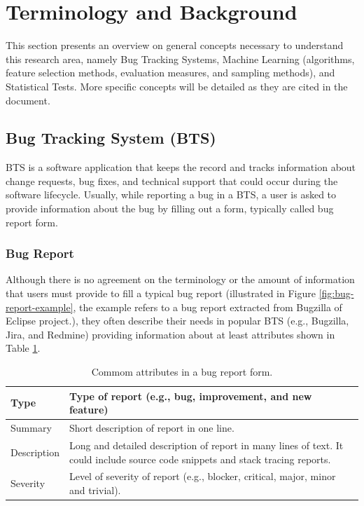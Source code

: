 \section{Terminology and Background}\label{sec:background} 
This section presents an overview on general concepts necessary to understand this research area, namely Bug Tracking Systems, Machine Learning (algorithms, feature selection methods, evaluation measures, and sampling methods), and Statistical Tests. More specific concepts will be detailed as they are cited in the document.

\subsection{Bug Tracking System (BTS)}

BTS\cite{Lamkanfi:2010} is a software application that keeps the record and tracks information about change requests, bug fixes, and technical support that could occur during the software lifecycle. Usually, while reporting a bug in a BTS, a user is asked to provide information about the bug by filling out a form, typically called bug report form. 

\subsubsection{Bug Report}
Although there is no agreement on the terminology or the amount of information that users must provide to fill a typical bug report (illustrated in Figure \ref{fig:bug-report-example}, the example refers to a bug report extracted from Bugzilla of Eclipse project.), they often describe their needs in popular BTS (e.g., Bugzilla, Jira, and Redmine)\cite{Tian:2012} providing information about at least attributes shown in Table \ref{tab:commom_attributes_bts_form}.  

\begin{table}[!htp] 
  \caption{Commom attributes in a bug report form.}
  \label{tab:commom_attributes_bts_form}
  \centering
  \begin{tabular}{|l|p{6cm}|}
    \hline
    Type & Type of report (e.g., bug, improvement, and new feature)\\
    \hline
    Summary & Short description of report in one line.\\
    \hline
    Description & Long and detailed description of report in many lines of text. It could include source code snippets and stack tracing reports.\\
    \hline
    Severity & Level of severity of report (e.g., blocker, critical, major, minor and trivial).\\
    \hline 
  \end{tabular}
\end{table}

